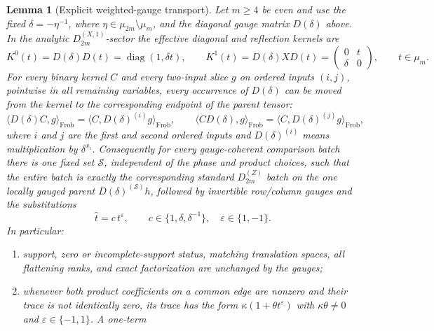 \documentclass[11pt,letterpaper,onecolumn]{article}
\theoremstyle{plain}
\newtheorem{lemma}[lemma]{Lemma}
\theoremstyle{definition}
\theoremstyle{remark}
\newcommand{\DihZ}[1]{{D_{#1}^{(Z)}}}
\newcommand{\DihXone}[1]{{D_{#1}^{(X,1)}}}
\newcommand{\diag}{\operatorname{diag}}
\begin{document}
\begin{lemma}[Explicit weighted-gauge transport]
\label{lem:marked-A-gauge-transport}
Let \(m\ge4\) be even and use the fixed
\(\delta=-\eta^{-1}\), where \(\eta\in\mu_{2m}\setminus\mu_m\), and the
diagonal gauge matrix \(D(\delta)\) above.  In the analytic \(\DihXone{2m}\)-sector the
effective diagonal and reflection kernels are
\begin{equation*}
 K^0(t)=D(\delta) D(t)=\diag(1,\delta t),
 \qquad
 K^1(t)=D(\delta) XD(t)=\begin{pmatrix}0&t\\ \delta&0\end{pmatrix},
 \qquad t\in \mu_m.
\end{equation*}
For every binary kernel \(C\) and every two-input slice \(g\) on ordered
inputs \((i,j)\), pointwise in all remaining variables, every occurrence of
\(D(\delta)\) can be moved from the kernel to the corresponding endpoint of
the parent tensor:
\begin{equation}
 \langle D(\delta) C,g\rangle_{\mathrm{Frob}}
   =\langle C,D(\delta)^{(i)}g\rangle_{\mathrm{Frob}},
 \qquad
 \langle C D(\delta),g\rangle_{\mathrm{Frob}}
   =\langle C,D(\delta)^{(j)}g\rangle_{\mathrm{Frob}},
 \label{eq:marked-A-gauge-push}
\end{equation}
where \(i\) and \(j\) are the first and second ordered inputs and
\(D(\delta)^{(i)}\) means multiplication by \(\delta^{x_i}\).  Consequently
for every gauge-coherent comparison batch there is one fixed set
\(\mathscr S\),
independent of the phase and product choices, such that the entire batch
is exactly the corresponding standard \(\DihZ{2m}\) batch on the one
locally gauged parent \(D(\delta)^{(\mathscr S)}h\), followed by invertible
row/column gauges and the substitutions
\begin{equation}
 \widehat t=c\,t^{\varepsilon},\qquad
 c\in\{1,\delta,\delta^{-1}\},\quad \varepsilon\in\{1,-1\}.
 \label{eq:marked-A-gauge-phase-substitution}
\end{equation}
In particular:
\begin{enumerate}
\item support, zero or incomplete-support status, matching translation spaces, all flattening ranks,
      and exact factorization are unchanged by the gauges;
\item whenever both product coefficients on a common edge are nonzero and their
      trace is not identically zero, its trace has the form
      \(\kappa(1+\theta t^{\varepsilon})\) with
      \(\kappa\theta\ne0\) and \(\varepsilon\in\{-1,1\}\). A one-term

\end{enumerate}
\end{lemma}
\end{document}
